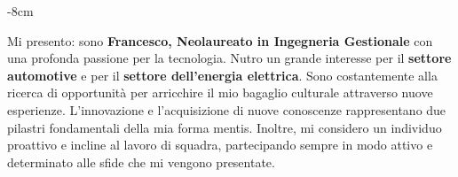 \documentclass[10pt,a4paper]{altacv}
\begin{document}







\begin{adjustwidth}{}{-8cm}
\makecvheader
\end{adjustwidth}

Mi presento: sono \textbf{Francesco, Neolaureato in Ingegneria Gestionale} con una profonda passione per la tecnologia. Nutro un grande
interesse per il \textbf{settore automotive} e per il \textbf{settore dell'energia elettrica}. Sono costantemente alla ricerca di
opportunità per arricchire il mio bagaglio culturale attraverso nuove esperienze. L'innovazione e l'acquisizione di
nuove conoscenze rappresentano due pilastri fondamentali della mia forma mentis. Inoltre, mi considero un
individuo proattivo e incline al lavoro di squadra, partecipando sempre in modo attivo e determinato alle sfide
che mi vengono presentate.


\end{document}
